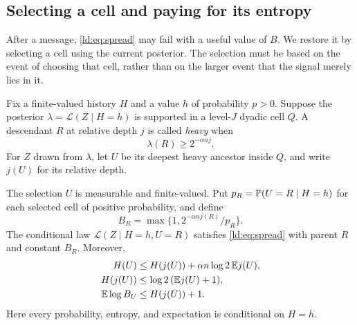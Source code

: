 \subsection{Selecting a cell and paying for its entropy}\label{ld:sec:localization}

After a message, \eqref{ld:eq:spread} may fail with a useful value of $B$.
We restore it by selecting a cell using the current posterior. The
selection must be based on the event of choosing that cell, rather than
on the larger event that the signal merely lies in it.

Fix a finite-valued history $H$ and a value $h$ of probability $p>0$.
Suppose the posterior $\lambda=\mathcal L(Z\mid H=h)$ is supported
in a level-$J$ dyadic cell $Q$. A descendant $R$ at relative depth $j$
is called \emph{heavy} when
\[
 \lambda(R)\ge2^{-\alpha nj}.
\]
For $Z$ drawn from $\lambda$, let $U$ be its deepest heavy ancestor
inside $Q$, and write $j(U)$ for its relative depth.

\begin{lemma}\label{ld:lem:heavy}
The selection $U$ is measurable and finite-valued. Put
$p_R=\mathbb P(U=R\mid H=h)$ for each selected cell of positive
probability, and define
\[
 B_R=\max\{1,2^{-\alpha n j(R)}/p_R\}.
\]
The conditional law $\mathcal L(Z\mid H=h,U=R)$ satisfies
\eqref{ld:eq:spread} with parent $R$ and constant $B_R$. Moreover,
\begin{align}
 H(U)&\le H(j(U))+\alpha n\log2\,\mathbb E j(U),\label{ld:eq:cell-entropy}\\
 H(j(U))&\le\log2\,(\mathbb E j(U)+1),\label{ld:eq:scale-entropy}\\
 \mathbb E\log B_U&\le H(j(U))+1.\label{ld:eq:excess-entropy}
\end{align}
Here every probability, entropy, and expectation is conditional on
$H=h$.
\end{lemma}

